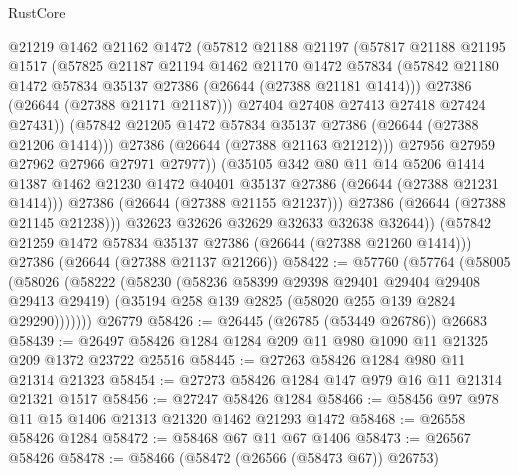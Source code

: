 \begin{lexlean}{RustCore}
\begin{coremodule}
                  @21219
                  @1462
                  @21162
                  @1472
                  (@57812
                    @21188
                    @21197
                    (@57817
                      @21188
                      @21195
                      @1517
                      (@57825
                        @21187
                        @21194
                        @1462
                        @21170
                        @1472
                        @57834
                        (@57842 @21180 @1472 @57834 @35137 @27386 (@26644 (@27388 @21181 @1414)))
                        @27386
                        (@26644 (@27388 @21171 @21187)))
                      @27404
                      @27408
                      @27413
                      @27418
                      @27424
                      @27431))
                  (@57842 @21205 @1472 @57834 @35137 @27386 (@26644 (@27388 @21206 @1414)))
                  @27386
                  (@26644 (@27388 @21163 @21212)))
                @27956
                @27959
                @27962
                @27966
                @27971
                @27977))
            (@35105
              @342
              @80
              @11
              @14
              @5206
              @1414
              @1387
              @1462
              @21230
              @1472
              @40401
              @35137
              @27386
              (@26644 (@27388 @21231 @1414)))
            @27386
            (@26644 (@27388 @21155 @21237)))
          @27386
          (@26644 (@27388 @21145 @21238)))
        @32623
        @32626
        @32629
        @32633
        @32638
        @32644))
    (@57842 @21259 @1472 @57834 @35137 @27386 (@26644 (@27388 @21260 @1414)))
    @27386
    (@26644 (@27388 @21137 @21266))
@58422 := @57760
    (@57764
      (@58005
        (@58026
          (@58222
            (@58230
              (@58236 @58399 @29398 @29401 @29404 @29408 @29413 @29419)
              (@35194 @258 @139 @2825 (@58020 @255 @139 @2824 @29290)))))))
    @26779
@58426 := @26445 (@26785 (@53449 @26786)) @26683
@58439 := @26497 @58426 @1284 @1284 @209 @11 @980 @1090 @11 @21325 @209 @1372 @23722 @25516
@58445 := @27263 @58426 @1284 @980 @11 @21314 @21323
@58454 := @27273 @58426 @1284 @147 @979 @16 @11 @21314 @21321 @1517
@58456 := @27247 @58426 @1284
@58466 := @58456 @97 @978 @11 @15 @1406 @21313 @21320 @1462 @21293 @1472
@58468 := @26558 @58426 @1284
@58472 := @58468 @67 @11 @67 @1406
@58473 := @26567 @58426
@58478 := @58466 (@58472 (@26566 (@58473 @67)) @26753)

\end{coremodule}
\end{lexlean}
